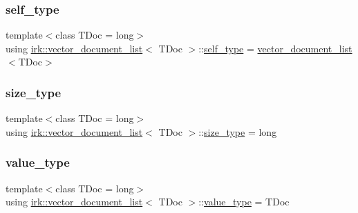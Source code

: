 \subsubsection{\texorpdfstring{self\+\_\+type}{self\_type}}
{\footnotesize\ttfamily template$<$class T\+Doc  = long$>$ \\
using \mbox{\hyperlink{classirk_1_1vector__document__list}{irk\+::vector\+\_\+document\+\_\+list}}$<$ T\+Doc $>$\+::\mbox{\hyperlink{classirk_1_1vector__document__list_a8c83c7819e9ffcbb4162d3ee9f41d76a}{self\+\_\+type}} =  \mbox{\hyperlink{classirk_1_1vector__document__list}{vector\+\_\+document\+\_\+list}}$<$T\+Doc$>$}

\mbox{\label{classirk_1_1vector__document__list_ac9387bd9f5dc89b638b6295858a9268c}} 
\subsubsection{\texorpdfstring{size\+\_\+type}{size\_type}}
{\footnotesize\ttfamily template$<$class T\+Doc  = long$>$ \\
using \mbox{\hyperlink{classirk_1_1vector__document__list}{irk\+::vector\+\_\+document\+\_\+list}}$<$ T\+Doc $>$\+::\mbox{\hyperlink{classirk_1_1vector__document__list_ac9387bd9f5dc89b638b6295858a9268c}{size\+\_\+type}} =  long}

\mbox{\label{classirk_1_1vector__document__list_a0ec9c56f5e12a3a9101b5a18b2fbe69f}} 
\subsubsection{\texorpdfstring{value\+\_\+type}{value\_type}}
{\footnotesize\ttfamily template$<$class T\+Doc  = long$>$ \\
using \mbox{\hyperlink{classirk_1_1vector__document__list}{irk\+::vector\+\_\+document\+\_\+list}}$<$ T\+Doc $>$\+::\mbox{\hyperlink{classirk_1_1vector__document__list_a0ec9c56f5e12a3a9101b5a18b2fbe69f}{value\+\_\+type}} =  T\+Doc}



